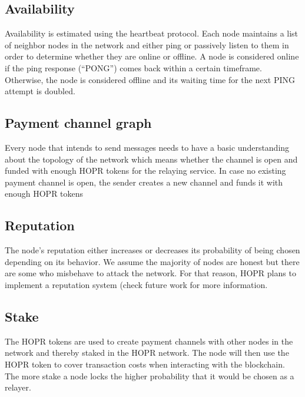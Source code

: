 \subsection{Availability}
Availability is estimated using the heartbeat protocol.
Each node maintains a list of neighbor nodes in the network and either ping or passively listen to them in order to determine whether they are online or offline.
A node is considered online if the ping response (“PONG”) comes back within a certain timeframe. Otherwise, the node is considered offline and its waiting time for the next PING attempt is doubled.


\subsection{Payment channel graph}
Every node that intends to send messages needs to have a basic understanding about the topology of the network which means whether the channel is open and funded with enough HOPR tokens for the relaying service. In case no existing payment channel is open, the sender creates a new channel and funds it with enough HOPR tokens

\subsection{Reputation}
The node’s reputation either increases or decreases its probability of being chosen depending on its behavior. We assume the majority of nodes are honest but there are some who misbehave to attack the network. For that reason, HOPR plans to implement a reputation system (check future work for more information.
\subsection{Stake}
The HOPR tokens are used to create payment channels with other nodes in the network and thereby staked in the HOPR network. The node will then use the HOPR token to cover transaction costs when interacting with the blockchain. The more stake a node locks the higher probability that it would be chosen as a relayer.

